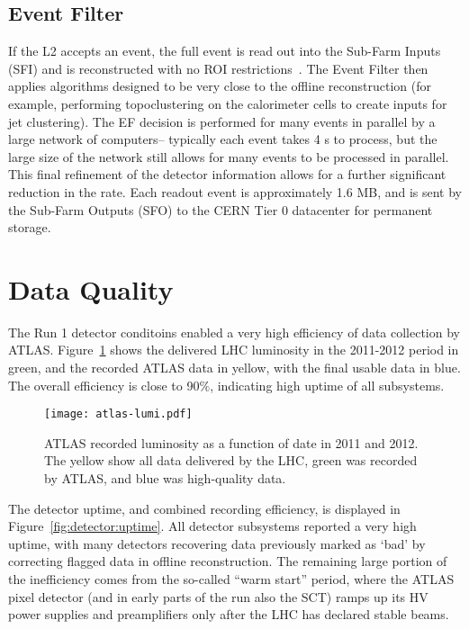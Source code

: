 \subsection{Event Filter}

If the L2 accepts an event, the full event is read out into the Sub-Farm Inputs (SFI) and is reconstructed with no ROI restrictions~\cite{ATLASPaper}. The Event Filter then applies algorithms designed to be very close to the offline reconstruction (for example, performing topoclustering on the calorimeter cells to create inputs for jet clustering). The EF decision is performed for many events in parallel by a large network of computers-- typically each event takes 4 s to process, but the large size of the network still allows for many events to be processed in parallel. This final refinement of the detector information allows for a further significant reduction in the rate. Each readout event is approximately 1.6 MB, and is sent by the Sub-Farm Outputs (SFO) to the CERN Tier 0 datacenter for permanent storage.


\section{Data Quality}
\label{atlas:data-quality}

The Run 1 detector conditoins enabled a very high efficiency of data collection by ATLAS. Figure~\ref{fig:detector:lumi} shows the delivered LHC luminosity in the 2011-2012 period in green, and the recorded ATLAS data in yellow, with the final usable data in blue. The overall efficiency is close to 90$\%$, indicating high uptime of all subsystems.


\begin{figure}
\centering
\texttt{[image: atlas-lumi.pdf]}
\label{fig:detector:lumi}
\caption{ATLAS recorded luminosity as a function of date in 2011 and 2012. The yellow show all data delivered by the LHC, green was recorded by ATLAS, and blue was high-quality data.}
\end{figure}


The detector uptime, and combined recording efficiency, is displayed in Figure~\ref{fig:detector:uptime}. All detector subsystems reported a very high uptime, with many detectors recovering data previously marked as `bad' by correcting flagged data in offline reconstruction. The remaining large portion of the inefficiency comes from the so-called ``warm start'' period, where the ATLAS pixel detector (and in early parts of the run also the SCT) ramps up its HV power supplies and preamplifiers only after the LHC has declared stable beams.

